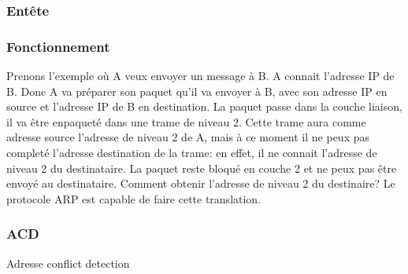 \documentclass[twoside,openright,a4paper,11pt,french]{article}
\begin{document}
\subsubsection{Entête}

\subsubsection{Fonctionnement}
Prenons l'exemple où A veux envoyer un message à B. A connait l'adresse IP de
B. Donc A va préparer son paquet qu'il va envoyer à B, avec son adresse IP en
source et l'adresse IP de B en destination. La paquet passe dans la couche
liaison, il va être enpaqueté dans une trame de niveau 2. Cette trame aura
comme adresse source l'adresse de niveau 2 de A, mais à ce moment il ne peux
pas completé l'adresse destination de la trame: en effet, il ne connait
l'adresse de niveau 2 du destinataire. La paquet reste bloqué en couche 2 et ne
peux pas être envoyé au destinataire. Comment obtenir l'adresse de niveau 2 du destinaire?
Le protocole ARP est capable de faire cette translation.

\subsubsection{ACD}
Adresse conflict detection
\end{document}
